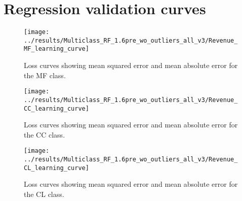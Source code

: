 \documentclass[14pt]{scrartcl}
\begin{document}
\section{Regression validation curves}\label{app:regression}
\begin{figure}[htpb!]
    \texttt{[image: ../results/Multiclass\_RF\_1.6pre\_wo\_outliers\_all\_v3/Revenue\_MF\_learning\_curve]}\\
    \caption{Loss curves showing mean squared error and mean absolute error for the
             MF class.}
    \label{fig:inclus_targets}
\end{figure}
\begin{figure}[htpb!]
    \texttt{[image: ../results/Multiclass\_RF\_1.6pre\_wo\_outliers\_all\_v3/Revenue\_CC\_learning\_curve]}\\
    \caption{Loss curves showing mean squared error and mean absolute error for the
             CC class.}
    \label{fig:inclus_targets}
\end{figure}
\begin{figure}[htpb!]
    \texttt{[image: ../results/Multiclass\_RF\_1.6pre\_wo\_outliers\_all\_v3/Revenue\_CL\_learning\_curve]}\\
    \caption{Loss curves showing mean squared error and mean absolute error for the
             CL class.}
    \label{fig:inclus_targets}
\end{figure}
\end{document}
